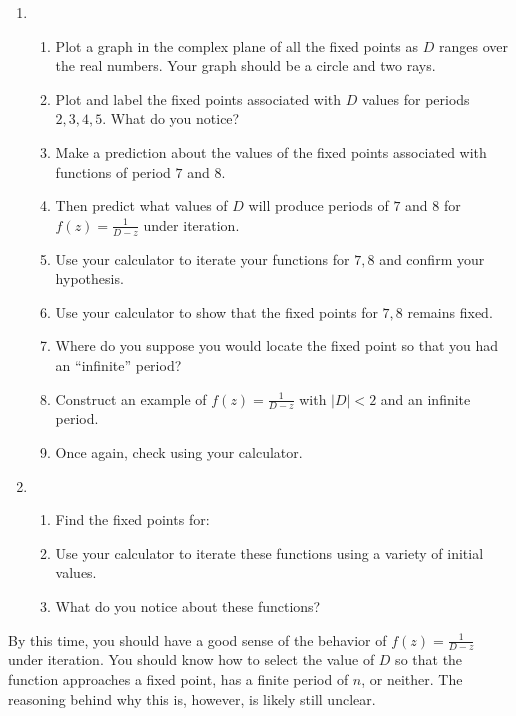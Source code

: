 \documentclass[../textbook.tex]{subfiles}
\begin{document}
\begin{enumerate}
\setcounter{enumi}{\value{problem_i}}
\item \begin{enumerate}
\item Plot a graph in the complex plane of all the fixed points as $D$ ranges over the real numbers. Your graph should be a circle and two rays.
\item Plot and label the fixed points associated with $D$ values for periods $2,3,4,5$. What do you notice?
\item Make a prediction about the values of the fixed points associated with functions of period $7$ and $8$.
\item Then predict what values of $D$ will produce periods of $7$ and $8$ for $f(z)=\frac{1}{D-z}$ under iteration.
\item Use your calculator to iterate your functions for $7,8$ and confirm your hypothesis.
\item Use your calculator to show that the fixed points for $7,8$ remains fixed.
\item Where do you suppose you would locate the fixed point so that you had an ``infinite'' period?
\item Construct an example of $f(z)=\frac{1}{D-z}$ with $|D|<2$ and an infinite period.
\item Once again, check using your calculator.
\end{enumerate}
\item \begin{enumerate}
\item Find the fixed points for:
\begin{enumerate}
\end{enumerate}
\item Use your calculator to iterate these functions using a variety of initial values.
\item What do you notice about these functions?
\end{enumerate}
\setcounter{problem_i}{\value{enumi}}
\end{enumerate}

\noindent By this time, you should have a good sense of the behavior of $f(z)=\frac{1}{D-z}$ under iteration. You should know how to select the value of $D$ so that the function approaches a fixed point, has a finite period of $n$, or neither. The reasoning behind why this is, however, is likely still unclear.
\end{document}

